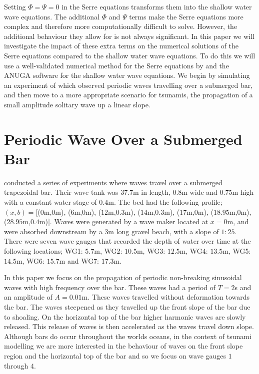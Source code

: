 \documentclass[a4paper,fleqn]{article} %
\begin{document}
Setting $\Phi = \Psi = 0$ in the Serre equations transforms them into the shallow water wave equations. The additional $\Phi$ and $\Psi$ terms make the Serre equations more complex and therefore more computationally difficult to solve. However, the additional behaviour they allow for is not always significant. In this paper we will investigate the impact of these extra terms on the numerical solutions of the Serre equations compared to the shallow water wave equations. To do this we will use a well-validated numerical method for the Serre equations by \cite{Zoppou-etal-2017} and the ANUGA software for the shallow water wave equations. We begin by simulating an experiment of \cite{Beji-Battjes-1994} which observed periodic waves travelling over a submerged bar, and then move to a more appropriate scenario for tsunamis, the propagation of a small amplitude solitary wave up a linear slope.

\section{Periodic Wave Over a Submerged Bar}
\label{Oscillatory Wave Over a Submerged Bar}
\cite{Beji-Battjes-1994} conducted a series of experiments where waves travel over a submerged trapezoidal bar. Their wave tank was $37.7$m in length, $0.8$m wide and $0.75$m high with a constant water stage of $0.4$m. The bed had the following profile; $(x,b) = [$($0$m,$0$m), ($6$m,$0$m), ($12$m,$0.3$m), ($14$m,$0.3$m), ($17$m,$0$m), ($18.95$m,$0$m), ($28.95$m,$0.4$m)$]$. Waves were generated by a wave maker located at $x=0$m, and were absorbed downstream by a $3$m long gravel beach, with a slope of $1:25$. There were seven wave gauges that recorded the depth of water over time at the following locations; WG1: $5.7$m, WG2: $10.5$m, WG3: $12.5$m, WG4: $13.5$m, WG5: $14.5$m, WG6: $15.7$m and WG7: $17.3$m.

In this paper we focus on the propagation of periodic non-breaking sinusoidal waves with high frequency over the bar. These waves had a period of $T = 2$s and an amplitude of $A = 0.01$m. These waves travelled without deformation towards the bar. The waves steepened as they travelled up the front slope of the bar due to shoaling. On the horizontal top of the bar higher harmonic waves are slowly released. This release of waves is then accelerated as the waves travel down slope. Although bars do occur throughout the worlds oceans, in the context of tsunami modelling we are more interested in the behaviour of waves on the front slope region and the horizontal top of the bar and so we focus on wave gauges $1$ through $4$. 
\end{document}
